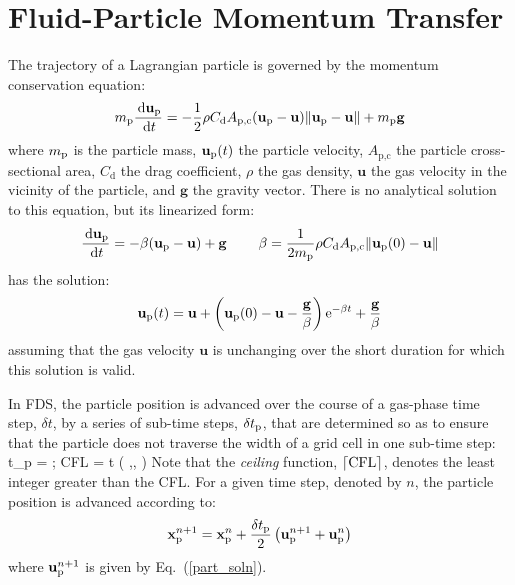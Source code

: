 \chapter{Fluid-Particle Momentum Transfer}
\label{particle_momentum_transfer}

The trajectory of a Lagrangian particle is governed by the momentum conservation equation:
\begin{equation}
    \label{particle_eom}
    m_{\rm p} \frac{\,\mathrm{d} \mathbf{u}_{\rm p}}{\,\mathrm{d} t} = - \frac{1}{2} \rho C_\text{d} A_\text{p,c} (\mathbf{u}_{\rm p} - \mathbf{u}) \|\mathbf{u}_{\rm p} - \mathbf{u}\| + m_{\rm p} \mathbf{g}
\end{equation}
where $m_{\rm p}$ is the particle mass, $\mathbf{u}_{\rm p}(t)$ the particle velocity, $A_\text{p,c}$ the particle cross-sectional area, $C_\text{d}$ the drag coefficient, $\rho$ the gas density, $\mathbf{u}$ the gas velocity in the vicinity of the particle, and $\mathbf{g}$ the gravity vector. There is no analytical solution to this equation, but its linearized form:
\begin{equation}
   \frac{\,\mathrm{d} \mathbf{u}_{\rm p}}{\,\mathrm{d} t} = - \beta (\mathbf{u}_{\rm p} - \mathbf{u}) + \mathbf{g}  \quad \; \quad \beta = \frac{1}{2 m_{\rm p}} \rho C_\text{d} A_\text{p,c} \|\mathbf{u}_{\rm p}(0) - \mathbf{u}\|
\end{equation}
has the solution:
\begin{equation}
   \label{part_soln}
   \mathbf{u}_{\rm p}(t) = \mathbf{u} + \left( \mathbf{u}_{\rm p}(0) - \mathbf{u} - \frac{\mathbf{g}}{\beta} \right) \hbox{e}^{-\beta t} + \frac{\mathbf{g}}{\beta}
\end{equation}
assuming that the gas velocity $\mathbf{u}$ is unchanging over the short duration for which this solution is valid.

In FDS, the particle position is advanced over the course of a gas-phase time step, $\delta t$, by a series of sub-time steps, $\delta t_{\rm p}$, that are determined so as to ensure that the particle does not traverse the width of a grid cell in one sub-time step:
\be
   \delta t_{\rm p} =  \quad ; \quad \hbox{CFL} = \delta t \max \left( ,, \right)
\ee
Note that the {\em ceiling} function, $\lceil \hbox{CFL} \rceil$, denotes the least integer greater than the CFL. For a given time step, denoted by $n$, the particle position is advanced according to:
\begin{equation}
    \mathbf{x}_{\rm p}^{n+1} = \mathbf{x}_{\rm p}^n + \frac{\delta t_{\rm p}}{2} \left( \mathbf{u}_{\rm p}^{n+1} + \mathbf{u}_{\rm p}^n \right)
\end{equation}
where $\mathbf{u}_{\rm p}^{n+1}$ is given by Eq.~(\ref{part_soln}).







